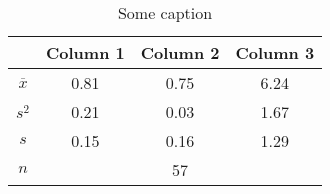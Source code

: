 \begin{small}
  \begin{table}[ht]
      \centering
      \renewcommand{\arraystretch}{0.7}
      \begin{tabular}{c c c c}
        \toprule
        &Column 1&Column 2&Column 3\\
        \midrule
        $\overline{x}$&0.81&0.75&6.24\\
        $s^2$&0.21&0.03&1.67\\
        $s$&0.15&0.16&1.29\\
        $n$&\multicolumn{3}{c}{57}\\
        \bottomrule
      \end{tabular}
      \caption{Some caption}\label{tab:foobar}
  \end{table}
\end{small}